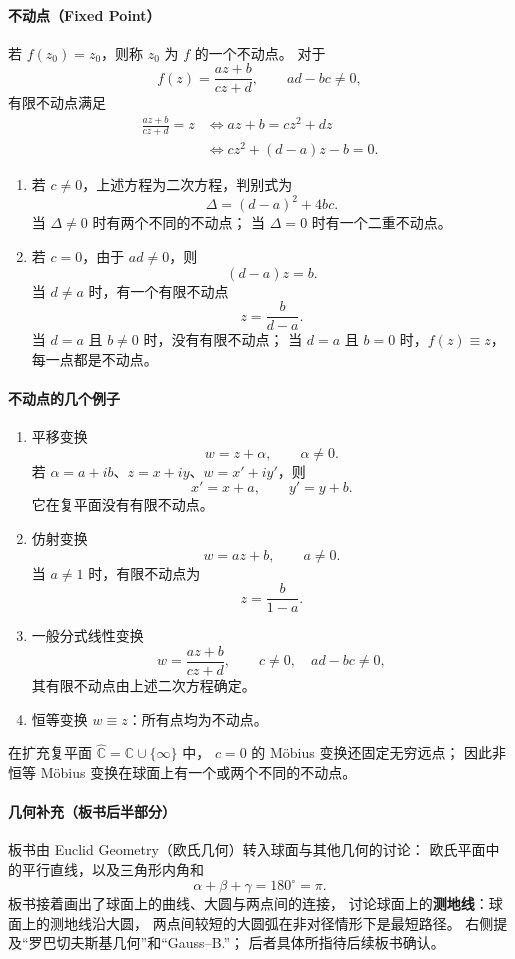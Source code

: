 \paragraph{不动点（Fixed Point）}
若 $f(z_0)=z_0$，则称 $z_0$ 为 $f$ 的一个不动点。
对于
\[
  f(z)=\frac{az+b}{cz+d},\qquad ad-bc\ne0,
\]
有限不动点满足
\begin{align*}
  \frac{az+b}{cz+d}=z
  &\iff az+b=cz^2+dz\\
  &\iff cz^2+(d-a)z-b=0.
\end{align*}

\begin{enumerate}
  \item 若 $c\ne0$，上述方程为二次方程，判别式为
  \[
    \Delta=(d-a)^2+4bc.
  \]
  当 $\Delta\ne0$ 时有两个不同的不动点；
  当 $\Delta=0$ 时有一个二重不动点。
  \item 若 $c=0$，由于 $ad\ne0$，则
  \[
    (d-a)z=b.
  \]
  当 $d\ne a$ 时，有一个有限不动点
  \[
    z=\frac{b}{d-a}.
  \]
  当 $d=a$ 且 $b\ne0$ 时，没有有限不动点；
  当 $d=a$ 且 $b=0$ 时，$f(z)\equiv z$，
  每一点都是不动点。
\end{enumerate}

\paragraph{不动点的几个例子}
\begin{enumerate}
  \item 平移变换
  \[
    w=z+\alpha,\qquad \alpha\ne0.
  \]
  若 $\alpha=a+ib$、$z=x+iy$、$w=x'+iy'$，则
  \[
    x'=x+a,\qquad y'=y+b.
  \]
  它在复平面没有有限不动点。
  \item 仿射变换
  \[
    w=az+b,\qquad a\ne0.
  \]
  当 $a\ne1$ 时，有限不动点为
  \[
    z=\frac{b}{1-a}.
  \]
  \item 一般分式线性变换
  \[
    w=\frac{az+b}{cz+d},\qquad
    c\ne0,\quad ad-bc\ne0,
  \]
  其有限不动点由上述二次方程确定。
  \item 恒等变换 $w\equiv z$：所有点均为不动点。
\end{enumerate}
在扩充复平面 $\widehat{\mathbb C}=\mathbb C\cup\{\infty\}$ 中，
$c=0$ 的 Möbius 变换还固定无穷远点；
因此非恒等 Möbius 变换在球面上有一个或两个不同的不动点。

\paragraph{几何补充（板书后半部分）}
板书由 Euclid Geometry（欧氏几何）转入球面与其他几何的讨论：
欧氏平面中的平行直线，以及三角形内角和
\[
  \alpha+\beta+\gamma=180^\circ=\pi.
\]
板书接着画出了球面上的曲线、大圆与两点间的连接，
讨论球面上的\textbf{测地线}：球面上的测地线沿大圆，
两点间较短的大圆弧在非对径情形下是最短路径。
右侧提及“罗巴切夫斯基几何”和“Gauss--B.”；
后者具体所指待后续板书确认。

